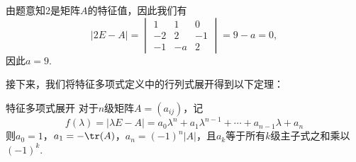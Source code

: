 \begin{solution}
    由题意知2是矩阵$A$的特征值，因此我们有
    \[|2E-A|=\begin{vmatrix}
            1 & 1 & 0 \\ -2 & 2 & -1 \\ -1 & -a & 2
        \end{vmatrix}=9-a=0,\]
    因此$a=9$.
\end{solution}

接下来，我们将特征多项式定义中的行列式展开得到以下定理：
\begin{theorem}{}{特征多项式展开}
    对于$n$级矩阵$A=(a_{ij})$，记
    \[f(\lambda)=|\lambda E-A|=a_0\lambda^n+a_1\lambda^{n-1}+\cdots+a_{n-1}\lambda+a_n\]
    则$a_0=1$，$a_1=-\tr(A)$，$a_n=(-1)^n|A|$，且$a_k$等于所有$k$级主子式之和乘以$(-1)^k$.
\end{theorem}

